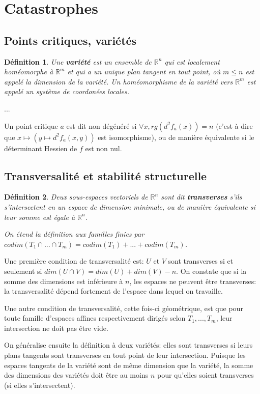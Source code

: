 \documentclass{article}
\newtheorem{defn}{Définition}
\begin{document}
\section{Catastrophes}

\subsection{Points critiques, variétés}

\begin{defn}
Une \textbf{variété} est un ensemble de $\mathbb{R}^n$ qui est localement homéomorphe à $\mathbb{R}^m$ et qui a un unique plan tangent en tout point, où $m\leq n$ est appelé la \textit{dimension de la variété}.
Un homéomorphisme de  la variété vers $\mathbb{R}^m$ est appelé un \textit{système de coordonées locales}.
\end{defn}

...

Un point critique $a$ est dit non dégénéré si $\forall x, rg(d^2f_a(x))=n$ (c'est à dire que $x\mapsto(y\mapsto d^2f_a(x,y))$ est isomorphisme), ou de manière équivalente si le déterminant Hessien de $f$ est non nul.

\subsection{Transversalité et stabilité structurelle}

\begin{defn}
Deux sous-espaces vectoriels de $\mathbb{R}^n$ sont dit \textbf{transverses} s'ils s'intersectent en un espace de dimension minimale, ou de manière équivalente si leur somme est égale à $\mathbb{R}^n$.

On étend la définition aux familles finies par $codim(T_1\cap...\cap T_m)=codim(T_1)+...+codim(T_m)$.
\end{defn}

Une première condition de transversalité est: $U$ et $V$ sont transverses si et seulement si $dim(U\cap V)=dim(U)+dim(V)-n$.
On constate que si la somme des dimensions est inférieure à $n$, les espaces ne peuvent être transverses: la transversalité dépend fortement de l'espace dans lequel on travaille.

Une autre condition de transversalité, cette fois-ci géométrique, est que pour toute famille d'espaces affines respectivement dirigés selon $T_1,...,T_m$, leur intersection ne doit pas être vide.

On généralise ensuite la définition à deux variétés: elles sont transverses si leurs plans tangents sont transverses en tout point de leur intersection.
Puisque les espaces tangents de la variété sont de même dimension que la variété, la somme des dimensions des variétés doit être au moins $n$ pour qu'elles soient transverses (si elles s'intersectent).
\end{document}
